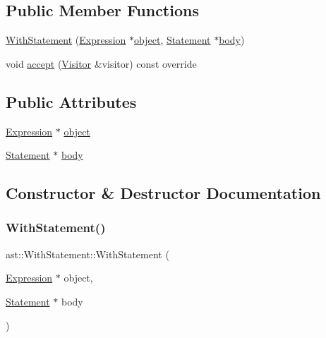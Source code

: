 \subsection*{Public Member Functions}
\begin{DoxyCompactItemize}
\item 
\hyperlink{structast_1_1_with_statement_a92a43fff1c740f1ec7bda9c2283f9619}{With\+Statement} (\hyperlink{structast_1_1_expression}{Expression} $\ast$\hyperlink{structast_1_1_with_statement_a8b135f7c09159d03c4c1cf6c0ff907ae}{object}, \hyperlink{structast_1_1_statement}{Statement} $\ast$\hyperlink{structast_1_1_with_statement_ae51c0f91d7f0c15c895892d40bed9768}{body})
\item 
void \hyperlink{structast_1_1_with_statement_ac2a6b5840df0da325c403fddf3dd3905}{accept} (\hyperlink{structast_1_1_visitor}{Visitor} \&visitor) const override
\end{DoxyCompactItemize}
\subsection*{Public Attributes}
\begin{DoxyCompactItemize}
\item 
\hyperlink{structast_1_1_expression}{Expression} $\ast$ \hyperlink{structast_1_1_with_statement_a8b135f7c09159d03c4c1cf6c0ff907ae}{object}
\item 
\hyperlink{structast_1_1_statement}{Statement} $\ast$ \hyperlink{structast_1_1_with_statement_ae51c0f91d7f0c15c895892d40bed9768}{body}
\end{DoxyCompactItemize}


\subsection{Constructor \& Destructor Documentation}
\mbox{\label{structast_1_1_with_statement_a92a43fff1c740f1ec7bda9c2283f9619}} 
\subsubsection{\texorpdfstring{With\+Statement()}{WithStatement()}}
{\footnotesize\ttfamily ast\+::\+With\+Statement\+::\+With\+Statement (\begin{DoxyParamCaption}\item[{\hyperlink{structast_1_1_expression}{Expression} $\ast$}]{object,  }\item[{\hyperlink{structast_1_1_statement}{Statement} $\ast$}]{body }\end{DoxyParamCaption})\hspace{0.3cm}{\ttfamily [inline]}}




